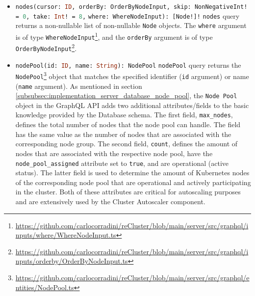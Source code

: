 \begin{itemize}
  \item \lstinline[language=graphql, morekeywords={[2]{Node, OrderByNodeInput, NonNegativeInt, WhereNodeInput}},
    morekeywords={[4]{cursor, orderBy, skip, take, where}}, morekeywords={[5]{nodes}}]{nodes(cursor: ID, orderBy: OrderByNodeInput, skip: NonNegativeInt! = 0, take: Int! = 8,}
    \newline
    \hphantom{-----------}\lstinline[language=graphql, morekeywords={[2]{Node, OrderByNodeInput, NonNegativeInt, WhereNodeInput}},
    morekeywords={[4]{cursor, orderBy, skip, take, where}}, morekeywords={[5]{nodes}}]{where: WhereNodeInput): [Node!]!}
    \newline
    \texttt{nodes} query returns a non-nullable list of non-nullable \texttt{Node}
    objects.
    \newline
    The \texttt{where} argument is of type \texttt{WhereNodeInput}\footnote{\url{https://github.com/carlocorradini/reCluster/blob/main/server/src/graphql/inputs/where/WhereNodeInput.ts}},
    and the \texttt{orderBy} argument is of type \texttt{OrderByNodeInput}\footnote{\url{https://github.com/carlocorradini/reCluster/blob/main/server/src/graphql/inputs/orderby/OrderByNodeInput.ts}}.

  \item \lstinline[language=graphql, morekeywords={[2]{NodePool}}, morekeywords={[4]{id, name}},
    morekeywords={[5]{nodePool}}]{nodePool(id: ID, name: String): NodePool}
    \newline
    \texttt{nodePool} query returns the \texttt{NodePool}\footnote{\url{https://github.com/carlocorradini/reCluster/blob/main/server/src/graphql/entities/NodePool.ts}}
    object that matches the specified identifier (\texttt{id} argument) or name (\texttt{name}
    argument).
    \newline
    As mentioned in section \ref{subsubsec:implementation_server_database_node_pool},
    the \texttt{Node Pool} object in the GraphQL API adds two additional attributes/fields
    to the basic knowledge provided by the Database schema. The first field, \texttt{max\_nodes},
    defines the total number of nodes that the node pool can handle. The field
    has the same value as the number of nodes that are associated with the
    corresponding node group. The second field, \texttt{count}, defines the
    amount of nodes that are associated with the respective node pool, have the \texttt{node\_pool\_assigned}
    attribute set to \texttt{true}, and are operational (active status). The latter
    field is used to determine the amount of Kubernetes nodes of the corresponding
    node pool that are operational and actively participating in the cluster.
    Both of these attributes are critical for autoscaling purposes and are
    extensively used by the Cluster Autoscaler component.


\end{itemize}
